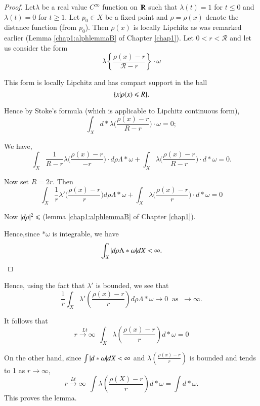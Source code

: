 \begin{proof}
  Let\pageoriginale $\lambda$ be a real value $C^\infty$ function on
  $\varmathbb{R}$ such that 
  $\lambda (t) = 1$ for $t \leqslant 0$ and $\lambda (t) = 0$ for
  $t\geqslant  1$. Let $p_0 \in X$ be a fixed point and $\rho = \rho
  (x)$ denote the distance function (from $p_0$). Then $\rho(x)$ is
  locally Lipchitz as was remarked earlier 
  (Lemma \ref{chap1:alphlemmaB} of Chapter \ref{chap1}). Let $0 < r <
  \mathcal{R}$ and let us consider the form 
  $$
  \lambda \left\{ \frac{\rho(x) - r}{\mathcal{R} - r} \right\} \cdot \omega 
  $$

  This form is locally Lipchitz and has compact support in the ball 
  $$ 
  \{ x \arrowvert \rho (x) \leqslant R \}.
  $$

  Hence by Stoke's formula (which is applicable to Lipchitz continuous
  form), 
  $$
  \int_X d* \lambda \bigg( \frac{\rho(x) - r}{R-r}\bigg) \cdot \omega
  = 0; 
  $$
  
  We have,
  $$
  \int_X \frac{1}{R-r} \lambda \bigg( \frac {\rho (x) - r}{-r}\bigg) \cdot d
  \rho \Lambda * \omega + \int_X \lambda \bigg( \frac{\rho (x) -
    r}{R-r}\bigg) \cdot d * \omega = 0.
  $$

  Now set $R = 2r$. Then
  $$
  \int_X \frac{1}{r} \lambda' \bigg(\frac{\rho(x) -
    r}{r}\bigg) d \rho \Lambda * \omega + \int_X \lambda \bigg( \frac
      {\rho (x) - r}{r}\bigg) \cdot d * \omega = 0
  $$

  Now $\arrowvert d \rho \arrowvert^2 \leqslant $ (lemma
  \ref{chap1:alphlemmaB} of Chapter \ref{chap1}). 
      
  Hence,\pageoriginale since $* \omega$ is integrable, we have 
  $$
  \int_X \arrowvert d \rho \Lambda * \omega \arrowvert dX < \infty. 
  $$
\end{proof}

  Hence, using the fact that $\lambda '$ is bounded, we see that
  $$
  \frac{1}{r} \int_X \lambda ' \left( \frac {\rho (x)-r}{r}\right) d
  \rho \Lambda * \omega \rightarrow 0~\text{ as }~ \rightarrow \infty.
  $$

  It follows that 
  $$
   \overset{Lt}{r \to \infty}~~ \int_X \lambda  \left( \frac
  {\rho (x)-r}{r}\right) d * \omega = 0
  $$

On the other hand, since $\int \arrowvert d * \omega \arrowvert d X <
\infty$ and $\lambda \left(\frac{\rho (x)-r}{r}\right)$ 
is bounded and tends to 1 as $r \rightarrow \infty$,
$$
r \overset{Lt} \rightarrow \infty~~ \int \lambda  \left(\frac{\rho
  (X)-r}{r}\right) d * \omega = \int d * \omega.
$$
This proves the lemma.

